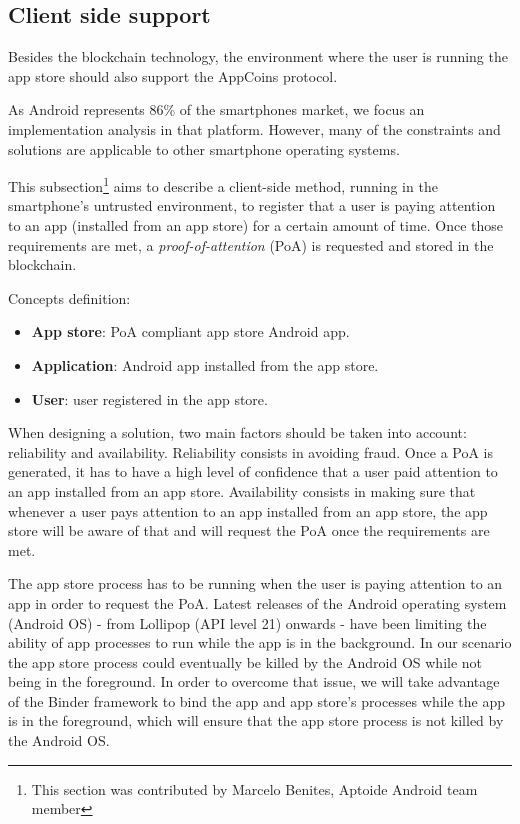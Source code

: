 \subsection{Client side support}

Besides the blockchain technology, the environment where the user is running the app store should also support the AppCoins protocol.


As Android represents 86\% of the smartphones market, we focus an implementation analysis in that platform. However, many of the constraints and solutions are applicable to other smartphone operating systems.

This subsection\footnote{This section was contributed by Marcelo Benites, Aptoide Android team member} aims to describe a client-side method, running in the smartphone's untrusted environment, to register that a user is paying attention to an app (installed from an app store) for a certain amount of time. Once those requirements are met, a \textit{proof-of-attention} (PoA) is requested and stored in the blockchain.
 
 
Concepts definition: %
\begin{itemize}
\item {\bf App store}: PoA compliant app store Android app.
\item {\bf Application}: Android app installed from the app store.
\item {\bf User}: user registered in the app store.
\end{itemize}

When designing a solution, two main factors should be taken into account: reliability and availability. Reliability consists in avoiding fraud. Once a \textsf{PoA} is generated, it has to have a high level of confidence that a user paid attention to an app installed from an app store. Availability consists in making sure that whenever a user pays attention to an app installed from an app store, the app store will be aware of that and will request the \textsf{PoA} once the requirements are met. %

The app store process has to be running when the user is paying attention to an app in order to request  the \textsf{PoA}. Latest releases of the Android operating system (Android OS) - from Lollipop (API level 21) onwards - have been limiting the ability of app processes to run while the app is in the background. In our scenario the app store process could eventually be killed by the Android OS while not being in the foreground. In order to overcome that issue, we will take advantage of the Binder framework to bind the app and app store's processes while the app is in the foreground, which will ensure that the app store process is not killed by the Android OS. 

